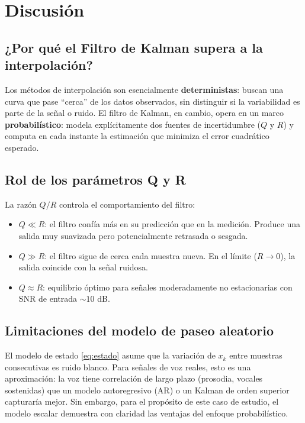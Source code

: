 \documentclass[12pt,a4paper]{article}
\begin{document}
\section{Discusión}

\subsection{¿Por qué el Filtro de Kalman supera a la interpolación?}

Los métodos de interpolación son esencialmente \textbf{deterministas}: buscan una
curva que pase ``cerca'' de los datos observados, sin distinguir si la variabilidad
es parte de la señal o ruido. El filtro de Kalman, en cambio, opera en un marco
\textbf{probabilístico}: modela explícitamente dos fuentes de incertidumbre ($Q$ y $R$)
y computa en cada instante la estimación que minimiza el error cuadrático esperado.

\subsection{Rol de los parámetros Q y R}

La razón $Q/R$ controla el comportamiento del filtro:

\begin{itemize}
  \item $Q \ll R$: el filtro confía más en su predicción que en la medición.
    Produce una salida muy suavizada pero potencialmente retrasada o sesgada.
  \item $Q \gg R$: el filtro sigue de cerca cada muestra nueva.
    En el límite ($R \to 0$), la salida coincide con la señal ruidosa.
  \item $Q \approx R$: equilibrio óptimo para señales moderadamente no estacionarias
    con SNR de entrada $\sim 10$ dB.
\end{itemize}

\subsection{Limitaciones del modelo de paseo aleatorio}

El modelo de estado \eqref{eq:estado} asume que la variación de $x_k$ entre muestras
consecutivas es ruido blanco. Para señales de voz reales, esto es una aproximación:
la voz tiene correlación de largo plazo (prosodia, vocales sostenidas) que un modelo
autoregresivo (AR) o un Kalman de orden superior capturaría mejor.
Sin embargo, para el propósito de este caso de estudio, el modelo escalar demuestra
con claridad las ventajas del enfoque probabilístico.
\end{document}
